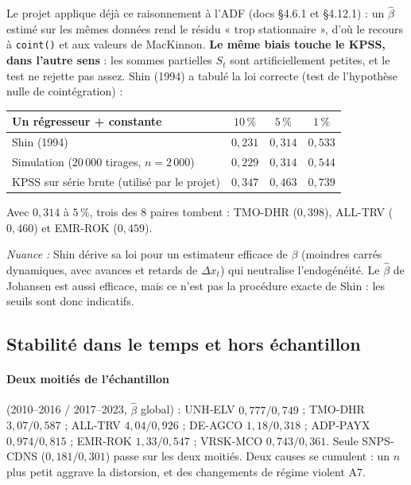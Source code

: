 \documentclass[11pt,a4paper]{article}
\newcommand{\code}[1]{\texttt{#1}}
\theoremstyle{definition}
\begin{document}
Le projet applique déjà ce raisonnement à l'ADF (docs \S4.6.1 et \S4.12.1) : un $\hat\beta$ estimé sur les mêmes données rend le résidu « trop stationnaire », d'où le recours à \code{coint()} et aux valeurs de MacKinnon. \textbf{Le même biais touche le KPSS, dans l'autre sens} : les sommes partielles $S_t$ sont artificiellement petites, et le test ne rejette pas assez. Shin (1994) a tabulé la loi correcte (test de l'hypothèse nulle de cointégration) :

\begin{center}
\begin{tabular}{@{}lccc@{}}
\toprule
Un régresseur + constante & $10\,\%$ & $5\,\%$ & $1\,\%$ \\
\midrule
Shin (1994) & $0{,}231$ & $0{,}314$ & $0{,}533$ \\
Simulation ($20\,000$ tirages, $n = 2\,000$) & $0{,}229$ & $0{,}314$ & $0{,}544$ \\
KPSS sur série brute (utilisé par le projet) & $0{,}347$ & $0{,}463$ & $0{,}739$ \\
\bottomrule
\end{tabular}
\end{center}

Avec $0{,}314$ à $5\,\%$, trois des $8$ paires tombent : TMO-DHR ($0{,}398$), ALL-TRV ($0{,}460$) et EMR-ROK ($0{,}459$).

\emph{Nuance :} Shin dérive sa loi pour un estimateur efficace de $\beta$ (moindres carrés dynamiques, avec avances et retards de $\Delta x_t$) qui neutralise l'endogénéité. Le $\hat\beta$ de Johansen est aussi efficace, mais ce n'est pas la procédure exacte de Shin : les seuils sont donc indicatifs.

\subsection{Stabilité dans le temps et hors échantillon}

\paragraph{Deux moitiés de l'échantillon} (2010--2016 / 2017--2023, $\hat\beta$ global) : UNH-ELV $0{,}777 / 0{,}749$ ; TMO-DHR $3{,}07 / 0{,}587$ ; ALL-TRV $4{,}04 / 0{,}926$ ; DE-AGCO $1{,}18 / 0{,}318$ ; ADP-PAYX $0{,}974 / 0{,}815$ ; EMR-ROK $1{,}33 / 0{,}547$ ; VRSK-MCO $0{,}743 / 0{,}361$. Seule SNPS-CDNS ($0{,}181 / 0{,}301$) passe sur les deux moitiés. Deux causes se cumulent : un $n$ plus petit aggrave la distorsion, et des changements de régime violent A7.
\end{document}
